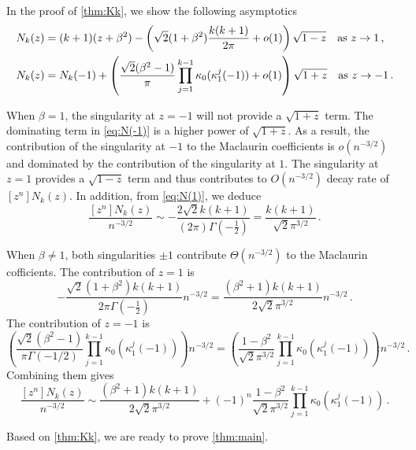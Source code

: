 \documentclass[11pt]{article}
\newcommand{\g}{\kappa_1}
\begin{document}
In the proof of \cref{thm:Kk}, we show the following asymptotics \begin{align}
    N_k(z) ={}& (k+1)(z+\beta^2) -\left(\sqrt{2}(1+\beta^2)\frac{k(k+1)}{2\pi} + o(1)\right) \sqrt{1-z} \quad \textnormal{as~} z\to 1\,,\label{eq:N(1)}\\
    N_k(z) ={}& N_k(-1) + \left(\frac{\sqrt{2}(\beta^2-1)}{\pi} \prod_{j=1}^{k-1} \kappa_0(\g^{j}(-1)) + o(1)\right)\sqrt{1+z} \quad \textnormal{as~} z\to -1\,.\label{eq:N(-1)}
\end{align}

When $\beta=1$, the singularity at $z=-1$ will not provide a $\sqrt{1+z}$ term. The dominating term in \eqref{eq:N(-1)} is a higher power of $\sqrt{1+z}$. As a result, the contribution of the singularity at $-1$ to the Maclaurin coefficients is $o(n^{-3/2})$ and dominated by the contribution of the singularity at $1$. The singularity at $z=1$ provides a $\sqrt{1-z}$ term and thus contributes to $O(n^{-3/2})$ decay rate of $[z^n]N_k(z)$. In addition, from \eqref{eq:N(1)}, we deduce \begin{equation}\label{eq:coeff1}
  \frac{[z^n]N_k(z)}{n^{-3/2}} \sim -\frac{ 2\sqrt{2} k (k+1)}{(2 \pi ) \Gamma \left(-\frac{1}{2}\right)}
  = \frac{k (k+1)}{\sqrt{2} \pi ^{3/2}}\,.
\end{equation}

When $\beta\ne 1$, both singularities $\pm 1$ contribute $\Theta(n^{-3/2})$ to the Maclaurin cofficients. The contribution of $z=1$ is \begin{equation*}
-\frac{\sqrt{2} (1+\beta^2) k (k+1)}{2 \pi  \Gamma \left(-\frac{1}{2}\right)} n^{-3/2} =
\frac{\left(\beta ^2+1\right) k (k+1)}{2 \sqrt{2} \pi ^{3/2}} n^{-3/2}
\,.
\end{equation*}
The contribution of $z=-1$ is \[
\left(\frac{\sqrt{2}(\beta^2-1)}{\pi\Gamma(-1/2)} \prod_{j=1}^{k-1} \kappa_0(\g^{j}(-1))\right) n^{-3/2}
= \left(\frac{1-\beta^2}{\sqrt{2} \pi ^{3/2}}\prod_{j=1}^{k-1} \kappa_0(\g^{j}(-1)) \right)n^{-3/2}\,.
\]
Combining them gives \begin{equation}\label{eq:coeff-ne1}
\frac{[z^n]N_k(z)}{n^{-3/2}} \sim \frac{(\beta^2+1)k (k+1)}{2 \sqrt{2} \pi ^{3/2}} + (-1)^n\frac{1-\beta^2}{\sqrt{2} \pi ^{3/2}}\prod_{j=1}^{k-1} \kappa_0(\g^{j}(-1))\,.
\end{equation}




Based on \cref{thm:Kk}, we are ready to prove \cref{thm:main}. 
\end{document}
